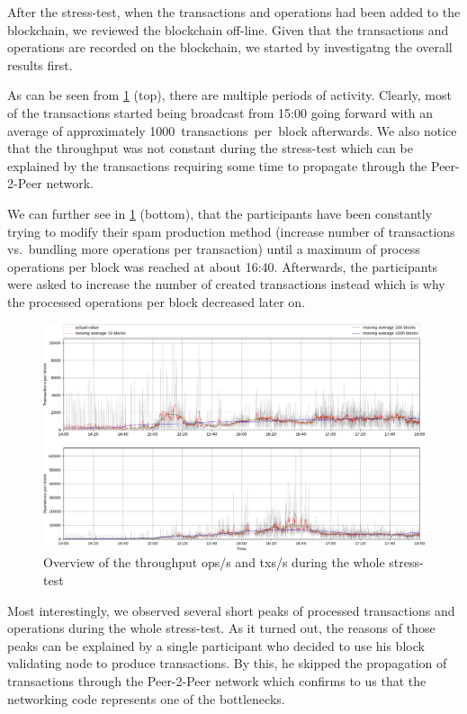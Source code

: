 After the stress-test, when the transactions and operations had been added to
the blockchain, we reviewed the blockchain off-line. Given
that the transactions and operations are recorded on the blockchain, we
started by investigatng the overall results first.

As can be seen from \cref{fig:tpsall} (top), there are multiple periods of
activity. Clearly, most of the transactions started being
broadcast from 15:00 going forward with an average of approximately
\SI{1000}{transactions per block} afterwards. We also notice that the
throughput was not constant during the stress-test which can be explained by the
transactions requiring some time to propagate through the Peer-2-Peer network.

We can further see in \cref{fig:tpsall} (bottom), that the participants have
been constantly trying to modify their spam production method (increase number
of transactions vs.\ bundling more operations per transaction) until a maximum
of process operations per block was reached at about 16:40. Afterwards, the
participants were asked to increase the number of created transactions
instead which is why the processed operations per block decreased later on.

\begin{figure}[!htp]
 \centering
 \includegraphics[width=\linewidth]{figures/stress-test-overview.png}
 \caption{Overview of the throughput ops/s and txs/s during the whole stress-test}
 \label{fig:tpsall}
\end{figure}

Most interestingly, we observed several short peaks of processed transactions and
operations during the whole stress-test. As it turned out, the reasons of those
peaks can be explained by a single participant who decided to use his
block validating node to produce transactions. By this, he skipped the
propagation of transactions through the Peer-2-Peer network which confirms to
us that the networking code represents one of the bottlenecks.

